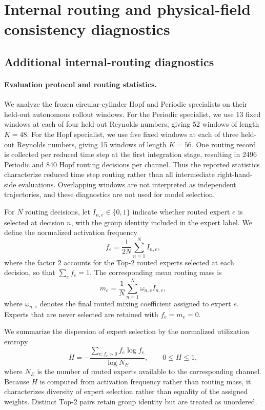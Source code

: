 \section{Internal routing and physical-field consistency diagnostics}
\label{app:routing_physics}

\subsection{Additional internal-routing diagnostics}
\label{app:internal_routing}

\paragraph{Evaluation protocol and routing statistics.}
We analyze the frozen circular-cylinder Hopf and Periodic specialists on their held-out autonomous rollout windows.
For the Periodic specialist, we use 13 fixed windows at each of four held-out Reynolds numbers, giving 52 windows of length $K=48$. For the Hopf specialist, we use five fixed windows at each of three held-out Reynolds numbers, giving 15 windows of length $K=56$. One routing record is collected per reduced time step at the first integration stage, resulting in 2496 Periodic and 840 Hopf routing decisions per channel. Thus the reported statistics characterize reduced time step routing rather than all intermediate right-hand-side evaluations. Overlapping windows are not interpreted as independent trajectories, and these diagnostics are not used for model selection.

For $N$ routing decisions, let $I_{n,e}\in\{0,1\}$ indicate whether routed expert $e$ is selected at decision $n$, with the group identity included in the expert label. We define the normalized activation frequency
\begin{equation}
  f_e
  =
  \frac{1}{2N}
  \sum_{n=1}^{N} I_{n,e},
  \label{eq:app_routing_frequency}
\end{equation}
where the factor $2$ accounts for the Top-2 routed experts selected at each decision, so that $\sum_e f_e=1$. The corresponding mean routing mass is
\begin{equation}
  m_e
  =
  \frac{1}{N}
  \sum_{n=1}^{N}
  \omega_{n,e}I_{n,e},
  \label{eq:app_routing_mass}
\end{equation}
where $\omega_{n,e}$ denotes the final routed mixing coefficient assigned to expert $e$. Experts that are never selected are retained with $f_e=m_e=0$.

We summarize the dispersion of expert selection by the normalized utilization entropy
\begin{equation}
  H
  =
  -\frac{
    \sum_{e:f_e>0} f_e\log f_e
  }{
    \log N_E
  },
  \qquad
  0\le H\le1,
  \label{eq:app_routing_entropy}
\end{equation}
where $N_E$ is the number of routed experts available to the corresponding channel. Because $H$ is computed from activation frequency rather than routing mass, it characterizes diversity of expert selection rather than equality of the assigned weights. Distinct Top-2 pairs retain group identity but are treated as unordered.

